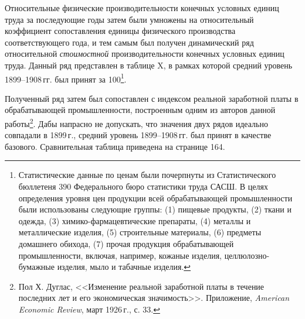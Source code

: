 \documentclass[leqno]{article}  %
\begin{document}
Относительные физические производительности конечных условных единиц труда за последующие годы затем были умножены на относительный коэффициент сопоставления единицы физического производства соответствующего года, и тем самым был получен динамический ряд относительной \emph{стоимостной} производительности конечных условных единиц труда. Данный ряд представлен в таблице X, в рамках которой средний уровень 1899--1908\,гг. был принят за 100\footnote{Статистические данные по ценам были почерпнуты из Статистического бюллетеня 390 Федерального бюро статистики труда САСШ. В целях определения уровня цен продукции всей обрабатывающей промышленности были использованы следующие группы: (1) пищевые продукты, (2) ткани и одежда, (3) химико-фармацевтические препараты, (4) металлы и металлические изделия, (5) строительные материалы, (6) предметы домашнего обихода, (7) прочая продукция обрабатывающей промышленности, включая, например, кожаные изделия, целлюлозно-бумажные изделия, мыло и табачные изделия.}.
\par
Полученный ряд затем был сопоставлен с индексом реальной заработной платы в обрабатывающей промышленности, построенным одним из авторов данной работы\footnote{Пол Х. Дуглас, <<Изменение реальной заработной платы в течение последних лет и его экономическая значимость>>. Приложение, \emph{American Economic Review}, март 1926\,г., с. 33.}. Дабы напрасно не допускать, что значения двух рядов идеально совпадали в 1899\,г., средний уровень
1899--1908\,гг. был принят в качестве базового. Сравнительная таблица приведена на странице 164.
\par
\end{document}
